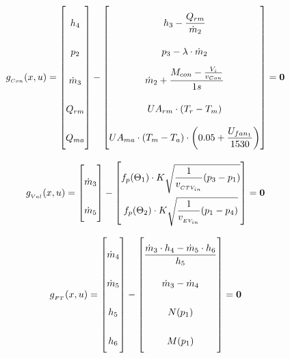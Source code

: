 \begin{equation} \label{eq:Gcondenser}\renewcommand{\arraystretch}{2.5}
	g_{_{Con}}(x,u) =  \begin{bmatrix}
		h_{4}				\\ %
		p_{2}				\\ %
		\dot{m}_{3}			\\ %
		Q_{rm}				\\
		Q_{ma}				\\
	\end{bmatrix}
	-
	\begin{bmatrix}
		h_{3} - \dfrac{Q_{rm}}{\dot{m}_{2}}	\\											%
		p_{3} - \lambda \cdot \dot{m}_{2}			\\									%
		\dot{m}_{2} + \dfrac{M_{con} - \frac{V_i}{v_{Con}}}{1s}	\\						%
		U A_{rm} \cdot (T_r - T_m) \\
		U A_{ma} \cdot (T_m - T_a)\cdot \left(0.05 + \dfrac{U_{fan_1}}{1530}\right) \\
	\end{bmatrix}
	=\textbf{0}
\end{equation}




\begin{equation} \label{eq:Gvalves}\renewcommand{\arraystretch}{2.5}
	g_{_{Val}}(x,u) =  \begin{bmatrix}
		\dot{m}_{3}			\\ %

		\dot{m}_{5}			\\ %
	\end{bmatrix}
	-
	\begin{bmatrix}
		f_p(\Theta_1) \cdot K  \sqrt{\dfrac{1}{v_{_{CTV_{in}}}} (p_{3} - p_{1})}\\		%
		f_p(\Theta_2) \cdot K  \sqrt{\dfrac{1}{v_{_{EV_{in}}}} (p_{1} - p_{4})}\\			%
	\end{bmatrix}
	=\textbf{0}
\end{equation}

\begin{equation} \label{eq:Gflashtank}\renewcommand{\arraystretch}{2.5}
	g_{_{FT}}(x,u) =  \begin{bmatrix}
		\dot{m}_{4}			\\
		\dot{m}_{5}				\\
		h_{5}  \\
		h_{6} \\
	\end{bmatrix}
	-
	\begin{bmatrix}
		\dfrac{\dot{m}_{3} \cdot h_4 - \dot{m}_{5} \cdot h_6}{h_5}					\\
		\dot{m}_{3} - \dot{m}_{4}					\\
		N(p_1)\\
		M(p_1)\\
	\end{bmatrix}
	=\textbf{0}
\end{equation}



